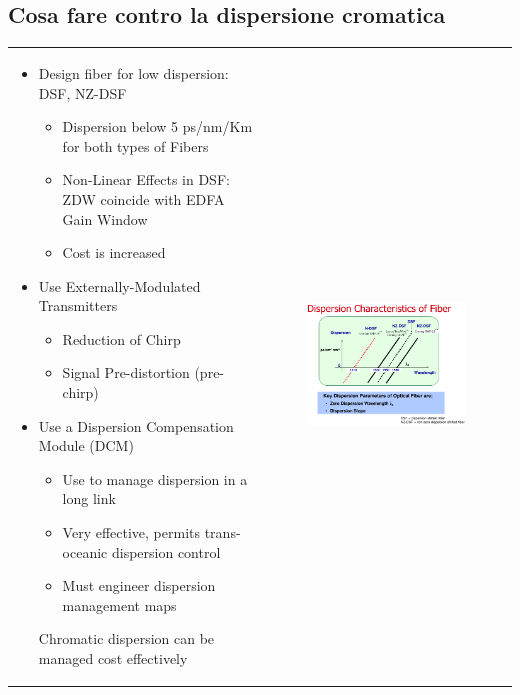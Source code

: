 \documentclass[8pt]{extarticle}
\begin{document}
\subsection{Cosa fare contro la dispersione cromatica}
\begin{tabular}{p{0.5\linewidth} p{0.5\linewidth}}
 	\vspace{0pt} 
    \begin{itemize}
		\item Design fiber for low dispersion: DSF, NZ-DSF
		\begin{itemize}
		\item Dispersion below 5 ps/nm/Km for both types of Fibers
		\item Non-Linear Effects in DSF: ZDW coincide with EDFA Gain
Window
		\item Cost is increased
		\end{itemize}
		\item Use Externally-Modulated Transmitters
		\begin{itemize}
			\item Reduction of Chirp
			\item Signal Pre-distortion (pre-chirp)
		\end{itemize}
		\item Use a Dispersion Compensation Module (DCM)
		\begin{itemize}
			\item  Use to manage dispersion in a long link
			\item Very effective, permits trans-oceanic dispersion control
			\item Must engineer dispersion management maps
		\end{itemize}
		Chromatic dispersion can be managed cost effectively
	\end{itemize}
    &
    \vspace{-0.5cm} 
    \begin{figure}[H]
		\includegraphics[width=0.5\linewidth]{images/FO9.png}
	\end{figure}
\end{tabular}
\pagebreak
\end{document}
